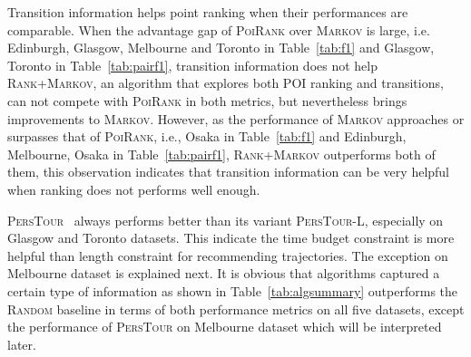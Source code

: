 Transition information helps point ranking when their performances are comparable. 
When the advantage gap of \textsc{PoiRank} over \textsc{Markov} is large,
i.e. Edinburgh, Glasgow, Melbourne and Toronto in Table~\ref{tab:f1} and Glasgow, Toronto in Table~\ref{tab:pairf1},
transition information does not help \textsc{Rank+Markov}, an algorithm that explores both POI ranking and transitions,
can not compete with \textsc{PoiRank} in both metrics, but nevertheless brings improvements to \textsc{Markov}.
However, as the performance of \textsc{Markov} approaches or surpasses that of \textsc{PoiRank},
i.e., Osaka in Table~\ref{tab:f1} and Edinburgh, Melbourne, Osaka in Table~\ref{tab:pairf1},
\textsc{Rank+Markov} outperforms both of them, this observation indicates that transition information can be very helpful when
ranking does not performs well enough.


\textsc{PersTour}~\cite{ijcai15} always performs better than its variant \textsc{PersTour-L}, 
especially on Glasgow and Toronto datasets. 
This indicate the time budget constraint is more helpful than length constraint for recommending trajectories.
The exception on Melbourne dataset is explained next.
It is obvious that algorithms captured a certain type of information as shown in Table~\ref{tab:algsummary}
outperforms the \textsc{Random} baseline in terms of both performance metrics on all five datasets,
except the performance of \textsc{PersTour}\cite{ijcai15} on Melbourne dataset which will be interpreted later.
%

